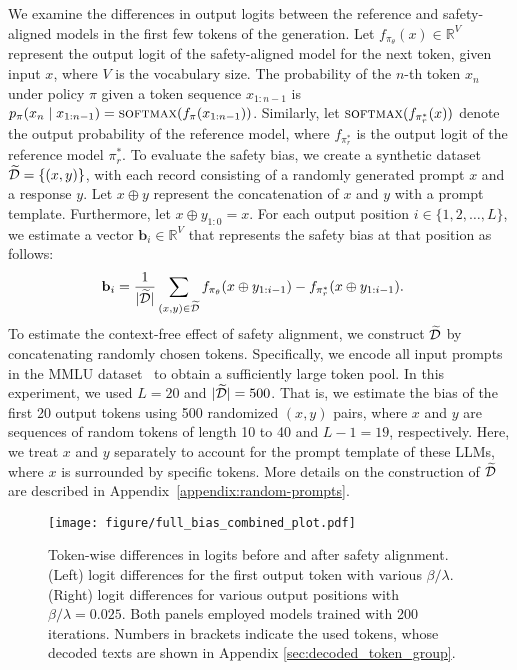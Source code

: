 We examine the differences in output logits between the reference and safety-aligned models in the first few tokens of the generation. Let $f_{\pi_\theta}(x) \in \mathbb{R}^{V}$ represent the output logit of the safety-aligned model for the next token, given input $x$, where $V$ is the vocabulary size. The probability of the $n$-th token $x_n$ under policy $\pi$ given a token sequence $x_{1:n-1}$ is $p_\pi(x_n \mid x_{1:n-1}) = \textsc{softmax}(f_\pi(x_{1:n-1}))$. Similarly, let $\textsc{softmax}(f_{\pi_{r}^*}(x))$ denote the output probability of the reference model, where $f_{\pi_{r}^*}$ is the output logit of the reference model $\pi_r^*$. To evaluate the safety bias, we create a synthetic dataset $\widetilde{\mathcal{D}} = \{(x, y)\}$, with each record consisting of a randomly generated prompt $x$ and a response $y$. Let $x \oplus y$ represent the concatenation of $x$ and $y$ with a prompt template. Furthermore, let $x \oplus y_{1:0} = x$. For each output position $i \in \{1, 2, \dots, L\}$, we estimate a vector $\mathbf{b}_i \in \mathbb{R}^{V}$ that represents the safety bias at that position as follows:
\begin{align*}
    \mathbf{b}_{i} &= \frac{1}{|\widetilde{\mathcal{D}}|} \sum_{(x,y) \in \widetilde{\mathcal{D}}} f_{\pi_\theta}(x \oplus y_{1:i-1}) - f_{\pi_{r}^*}(x \oplus y_{1:i-1}).
\end{align*}
%
To estimate the context-free effect of safety alignment, we construct $\widetilde{\mathcal{D}}$ by concatenating randomly chosen tokens. Specifically, we encode all input prompts in the MMLU dataset~\citep{hendryckstest2021} to obtain a sufficiently large token pool. In this experiment, we used $L=20$ and $|\widetilde{\mathcal{D}}|=500$. That is, we estimate the bias of the first 20 output tokens using 500 randomized $(x, y)$ pairs, where $x$ and $y$ are sequences of random tokens of length 10 to 40 and $L-1 = 19$, respectively. Here, we treat $x$ and $y$ separately to account for the prompt template of these LLMs, where $x$ is surrounded by specific tokens. More details on the construction of $\widetilde{\mathcal{D}}$ are described in Appendix~\ref{appendix:random-prompts}. 

\begin{figure*}[t]
    \centering
    \texttt{[image: figure/full\_bias\_combined\_plot.pdf]}
    \caption{Token-wise differences in logits before and after safety alignment. (Left) logit differences for the first output token with various $\beta/\lambda$. (Right) logit differences for various output positions with $\beta/\lambda=0.025$. Both panels employed models trained with 200 iterations. Numbers in brackets indicate the used tokens, whose decoded texts are shown in Appendix \ref{sec:decoded_token_group}.}
    \label{fig:token-wise-bias}
\end{figure*}

